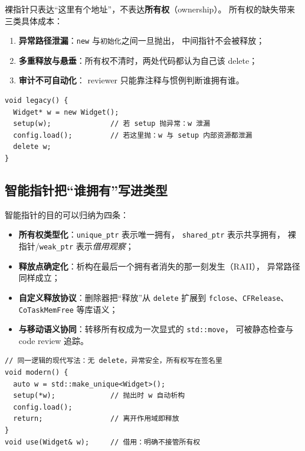 \documentclass[12pt,a4paper,fontset=fandol]{ctexbook}
\begin{document}
裸指针只表达``这里有个地址''，不表达\textbf{所有权}（ownership）。
所有权的缺失带来三类具体成本：

\begin{enumerate}
  \item \textbf{异常路径泄漏}：\texttt{new} 与\texttt{初始化}之间一旦抛出，
        中间指针不会被释放；
  \item \textbf{多重释放与悬垂}：所有权不清时，两处代码都认为自己该 delete；
  \item \textbf{审计不可自动化}： reviewer 只能靠注释与惯例判断谁拥有谁。
\end{enumerate}

\begin{lstlisting}
void legacy() {
  Widget* w = new Widget();
  setup(w);              // 若 setup 抛异常：w 泄漏
  config.load();         // 若这里抛：w 与 setup 内部资源都泄漏
  delete w;
}
\end{lstlisting}

\subsection{智能指针把``谁拥有''写进类型}

智能指针的目的可以归纳为四条：

\begin{itemize}
  \item \textbf{所有权类型化}：\texttt{unique\_ptr} 表示唯一拥有，
        \texttt{shared\_ptr} 表示共享拥有，
        裸指针/\allowbreak{}\texttt{weak\_ptr} 表示\emph{借用观察}；
  \item \textbf{释放点确定化}：析构在最后一个拥有者消失的那一刻发生（RAII），
        异常路径同样成立；
  \item \textbf{自定义释放协议}：删除器把``释放''从 \texttt{delete}
        扩展到 \texttt{fclose}、\texttt{CFRelease}、
        \texttt{Co\allowbreak{}Task\allowbreak{}Mem\allowbreak{}Free} 等库语义；
  \item \textbf{与移动语义协同}：转移所有权成为一次显式的 \texttt{std::move}，
        可被静态检查与 code review 追踪。
\end{itemize}

\begin{lstlisting}
// 同一逻辑的现代写法：无 delete，异常安全，所有权写在签名里
void modern() {
  auto w = std::make_unique<Widget>();
  setup(*w);             // 抛出时 w 自动析构
  config.load();
  return;                // 离开作用域即释放
}
void use(Widget& w);     // 借用：明确不接管所有权
\end{lstlisting}
\end{document}
